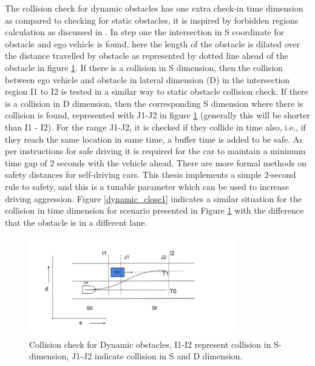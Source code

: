 The collision check for dynamic obstacles has one extra check-in time dimension as compared to checking for static obstacles, it is inspired by forbidden regions calculation as discussed in \cite{graff_thesis}. In step one the intersection in S coordinate for obstacle and ego vehicle is found, here the length of the obstacle is dilated over the distance travelled by obstacle as represented by dotted line ahead of the obstacle in figure \ref{dynamic_check}. If there is a collision in S dimension, then the collision between ego vehicle and obstacle in lateral dimension (D) in the intersection region I1 to I2 is tested in a similar way to static obstacle collision check. If there is a collision in D dimension, then the corresponding S dimension where there is collision is found, represented with J1-J2 in figure \ref{dynamic_check} (generally this will be shorter than I1 - I2). For the range J1-J2, it is checked if they collide in time also, i.e., if they reach the same location in same time, a buffer time is added to be safe. As per instructions for safe driving it is required for the car to maintain a minimum time gap of 2 seconds with the vehicle ahead. There are more formal methods \cite{mobile_eye_safety_distance} on safety distances for self-driving cars. This thesis implements a simple 2-second rule to safety, and this is a tunable parameter which can be used to increase driving aggression. Figure \ref{dynamic_close1} indicates a similar situation for the collision in time dimension for scenario presented in Figure \ref{dynamic_check} with the difference that the obstacle is in a different lane.

 \begin{figure}
	\centering
	\includegraphics[width=0.8\textwidth]{Images/dynamic_check.png}
	\caption{Collision check for Dynamic obstacles, I1-I2 represent collision in S-dimension, J1-J2 indicate collision in S and D dimension.}
	\label{dynamic_check}
\end{figure}


